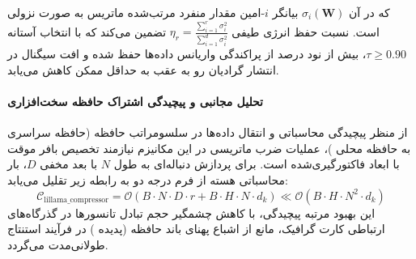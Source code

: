 که در آن $\sigma_i(\mathbf{W})$ بیانگر $i$-امین مقدار منفرد مرتب‌شده ماتریس به صورت نزولی است. نسبت حفظ انرژی طیفی $\eta_r = \frac{\sum_{i=1}^r \sigma_i^2}{\sum_{i=1}^{d} \sigma_i^2}$ تضمین می‌کند که با انتخاب آستانه $\tau \ge 0.90$، بیش از نود درصد از پراکندگی واریانس داده‌ها حفظ شده و افت سیگنال در انتشار گرادیان رو به عقب به حداقل ممکن کاهش می‌یابد.

\paragraph{تحلیل مجانبی و پیچیدگی اشتراک حافظه سخت‌افزاری}
از منظر پیچیدگی محاسباتی و انتقال داده‌ها در سلسومراتب حافظه (حافظه سراسری  به حافظه محلی )، عملیات ضرب ماتریسی در این مکانیزم نیازمند تخصیص بافر موقت با ابعاد فاکتورگیری‌شده است. برای پردازش دنباله‌ای به طول $N$ با بعد مخفی $D$، بار محاسباتی هسته از فرم درجه دو به رابطه زیر تقلیل می‌یابد:
\begin{equation}
\label{eq:complexity_lillama_compressor}
\mathcal{C}_{\text{lillama\_compressor}} = \mathcal{O}\left( B \cdot N \cdot D \cdot r + B \cdot H \cdot N \cdot d_k \right) \ll \mathcal{O}\left( B \cdot H \cdot N^2 \cdot d_k \right)
\end{equation}
این بهبود مرتبه پیچیدگی، با کاهش چشمگیر حجم تبادل تانسورها در گذرگاه‌های ارتباطی کارت گرافیک، مانع از اشباع پهنای باند حافظه (پدیده ) در فرآیند استنتاج طولانی‌مدت می‌گردد.
